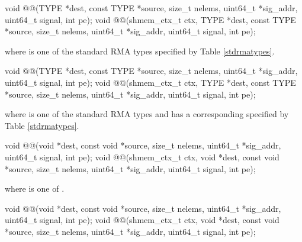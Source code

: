 
\begin{apidefinition}

\begin{C11synopsis}
void @@(TYPE *dest, const TYPE *source, size_t nelems, uint64_t *sig_addr, uint64_t signal, int pe);
void @@(shmem_ctx_t ctx, TYPE *dest, const TYPE *source, size_t nelems, uint64_t *sig_addr, uint64_t signal, int pe);
\end{C11synopsis}
where \TYPE{} is one of the standard \ac{RMA} types specified by Table \ref{stdrmatypes}.

\begin{Csynopsis}
void @@(TYPE *dest, const TYPE *source, size_t nelems, uint64_t *sig_addr, uint64_t signal, int pe);
void @@(shmem_ctx_t ctx, TYPE *dest, const TYPE *source, size_t nelems, uint64_t *sig_addr, uint64_t signal, int pe);
\end{Csynopsis}
where \TYPE{} is one of the standard \ac{RMA} types and has a corresponding \TYPENAME{} specified by Table \ref{stdrmatypes}.

\begin{CsynopsisCol}
void @@(void *dest, const void *source, size_t nelems, uint64_t *sig_addr, uint64_t signal, int pe);
void @@(shmem_ctx_t ctx, void *dest, const void *source, size_t nelems, uint64_t *sig_addr, uint64_t signal, int pe);
\end{CsynopsisCol}
where \SIZE{} is one of .

\begin{CsynopsisCol}
void @@(void *dest, const void *source, size_t nelems, uint64_t *sig_addr, uint64_t signal, int pe);
void @@(shmem_ctx_t ctx, void *dest, const void *source, size_t nelems, uint64_t *sig_addr, uint64_t signal, int pe);
\end{CsynopsisCol}


\end{apidefinition}
